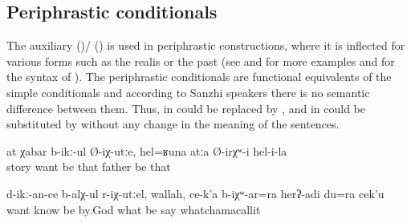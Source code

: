 
\subsection{Periphrastic conditionals}
\label{ssec:Periphrastic conditionals}

The auxiliary  ()\slash{} ()  is used in periphrastic  constructions, where it is inflected for various  forms such as the realis   or the past   (see  and  for more examples and  for the syntax of ). The periphrastic conditionals are functional equivalents of the simple conditionals and according to Sanzhi speakers there is no semantic difference between them. Thus, in   could be replaced by , and in   could be substituted by  without any change in the meaning of the sentences.
%
\begin{exe}
	\ex	\label{ex:‎If you want stories, (here is one), she had such a father (and these were the stories about him)}
	\gll	at	χabar	b-ikː-ul	Ø-iχ-utːe,	hel=ʁuna	atːa	Ø-irχʷ-i	hel-i-la\\
			story	want	be	that	father	be	that\\
	\glt	{}

	\ex	\label{ex:‎If I would have known what you want, by God, I would also have said something}
	\gll	d-ikː-an-ce	b-alχ-ul	r-iχ-utːel,	wallah,	ce-k'a	b-iχʷ-ar=ra	herʔ-adi		du=ra	cek'u\\
		want	know	be	by.God	what	be	say		whatchamacallit\\
	\glt	{}
\end{exe}


